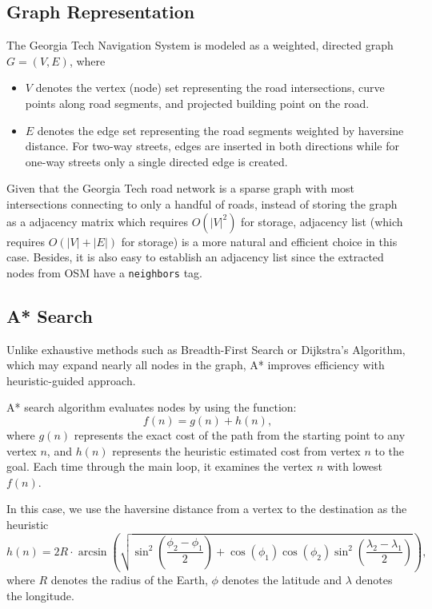 \documentclass[fleqn,10pt]{olplainarticle}
\begin{document}
\subsection*{Graph Representation}
The Georgia Tech Navigation System is modeled as a weighted, directed graph $G = (V, E)$, where
\begin{itemize}
    \item $V$ denotes the vertex (node) set representing the road intersections, curve points along road segments, and projected building point on the road.
    \item $E$ denotes the edge set representing the road segments weighted by haversine distance. For two-way streets, edges are inserted in both directions while for one-way streets only a single directed edge is created.
\end{itemize}
Given that the Georgia Tech road network is a sparse graph with most intersections connecting to only a handful of roads, instead of storing the graph as a adjacency matrix which requires $O(|V|^2)$ for storage, adjacency list (which requires $O(|V|+|E|)$ for storage) is a more natural and efficient choice in this case. Besides, it is also easy to establish an adjacency list since the extracted nodes from OSM have a \texttt{neighbors} tag.

\subsection*{A* Search}

Unlike exhaustive methods such as Breadth-First Search or Dijkstra’s Algorithm, which may expand nearly all nodes in the graph, A* improves efficiency with heuristic-guided approach.

A* search algorithm evaluates nodes by using the function:
\[
f(n) = g(n)+h(n),
\]
where $g(n)$ represents the exact cost of the path from the starting point to any vertex $n$, and $h(n)$ represents the heuristic estimated cost from vertex $n$ to the goal. Each time through the main loop, it examines the vertex $n$ with lowest $f(n)$.

In this case, we use the haversine distance from a vertex to the destination as the heuristic
\[
h(n) =  2R \cdot \arcsin\!\left( \sqrt{ \sin^2\!\left(\frac{\phi_2 - \phi_1}{2}\right) + \cos(\phi_1)\cos(\phi_2)\sin^2\!\left(\frac{\lambda_2 - \lambda_1}{2}\right) } \right),
\] where $R$ denotes the radius of the Earth, $\phi$ denotes the latitude and $\lambda$ denotes the longitude.
\end{document}
